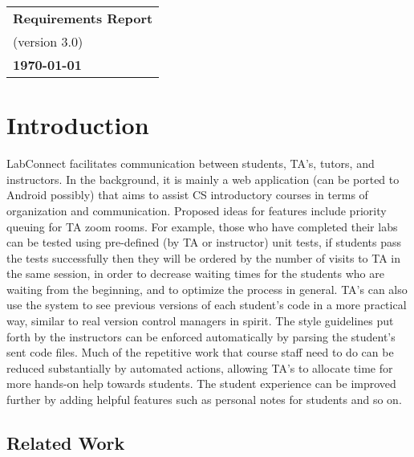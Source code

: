 \documentclass[a4paper, 12pt]{article}
\begin{document}
    \begin{table}[h!]
        \renewcommand{\arraystretch}{1.5}
        \centering
        \begin{tabular}{ |>{\centering\arraybackslash}m{15.15cm}| }
            \hline
            \Large \textbf{Requirements Report} \\
            \small (version 3.0) \\
            \small \textbf{\today} \\
            \hline
        \end{tabular}
    \end{table}


    \section{Introduction}

    LabConnect facilitates communication between students, TA's, tutors,
    and instructors. In the background, it is mainly a web application
    (can be ported to Android possibly) that aims to assist CS introductory
    courses in terms of organization and communication. Proposed ideas for
    features include priority queuing for TA zoom rooms. For example, those
    who have completed their labs can be tested using pre-defined (by TA or
    instructor) unit tests, if students pass the tests successfully then they will be
    ordered by the number of visits to TA in the same session, in order to decrease
    waiting times for the students who are waiting from the beginning, and
    to optimize the process in general. TA's can also use the system to see
    previous versions of each student's code in a more practical way,
    similar to real version control managers in spirit. The style guidelines
    put forth by the instructors can be enforced automatically by parsing
    the student's sent code files. Much of the repetitive work that course
    staff need to do can be reduced substantially by automated actions,
    allowing TA's to allocate time for more hands-on help towards students.
    The student experience can be improved further by adding helpful
    features such as personal notes for students and so on.

    \subsection{Related Work}
\end{document}

